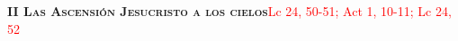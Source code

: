\noindent\textbf{\textsc{II Las Ascensión Jesucristo a los cielos}}\hfill\textcolor{red}{Lc 24, 50-51; Act 1, 10-11; Lc 24, 52 }

\vspace{0.25em}

